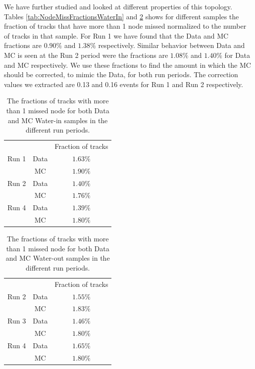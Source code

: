 We have further studied and looked at different properties of this topology. 
Tables \ref{tab:NodeMissFractionsWaterIn} 
and \ref{tab:NodeMissFractionsWaterOut} shows for different samples 
the fraction of tracks that have more than 1 node missed normalized 
to the number of tracks in that sample.
For Run 1 we have found that the Data and MC fractions 
are $0.90\%$ and $1.38\%$ respectively. 
Similar behavior between Data and MC is seen at the Run 2 period 
were the fractions are $1.08\%$ and $1.40\%$ for Data and MC respectively. 
We use these fractions to find the amount in which the MC 
should be corrected, to mimic the Data, for both run periods.
The correction values we extracted are 0.13 and 0.16 events for 
Run 1 and Run 2 respectively. \\

\begin{table}[h]
\centering
\begin{tabular}{lcc}\toprule
      & &  Fraction of tracks \\
\cline{2-3}
Run 1 & Data & $1.63\%$  \\ 
      & MC & $1.90\%$  \\ 
\cline{2-3}
Run 2 & Data & $1.40\%$  \\ 
      & MC & $1.76\%$ \\ 
\cline{2-3}
Run 4 & Data & $1.39\%$  \\ 
      & MC & $1.80\%$ \\ 
\bottomrule
\end{tabular}
\caption{The fractions of tracks with more than 1 missed node 
for both Data and MC Water-in samples in the different run periods.}
\label{tab:NodeMissFractions}
\end{table}

\begin{table}[h]
\centering
\begin{tabular}{lcc}\toprule
      & &  Fraction of tracks \\
\cline{2-3}
Run 2 & Data & $1.55\%$  \\ 
      & MC & $1.83\%$  \\ 
\cline{2-3}
Run 3 & Data & $1.46\%$  \\ 
      & MC & $1.80\%$ \\ 
\cline{2-3}
Run 4 & Data & $1.65\%$  \\ 
      & MC & $1.80\%$ \\ 
\bottomrule
\end{tabular}
\caption{The fractions of tracks with more than 1 missed node 
for both Data and MC Water-out samples in the different run periods.}
\label{tab:NodeMissFractionsWaterOut}
\end{table}

